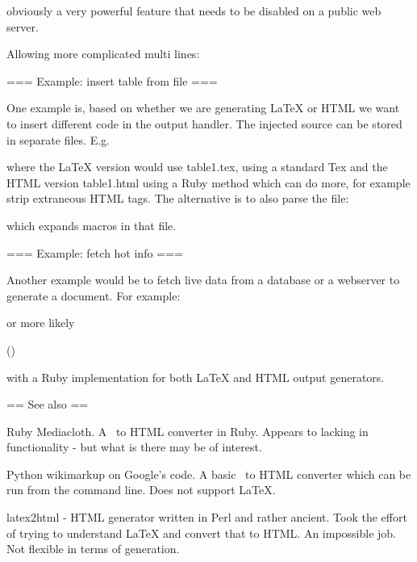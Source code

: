 
obviously a very powerful feature that needs to be disabled on a public web server.

Allowing more complicated multi lines:



=== Example: insert table from file ===
  
One example is, based on whether we are generating LaTeX or HTML we
want to insert different code in the output handler. The injected
source can be stored in separate files. E.g.


where the LaTeX version would use table1.tex, using a standard Tex
 and the HTML version table1.html using a Ruby method
which can do more, for example strip extraneous HTML tags. The
alternative is to also parse the file:


which expands macros in that file.

=== Example: fetch hot info ===

Another example would be to fetch live data from a database or a
webserver to generate a document. For example:


or more likely

  \userinfo(\username)

with a Ruby implementation for both LaTeX and HTML output generators.


== See also ==

Ruby Mediacloth. A \mediawiki\ to HTML converter in Ruby. Appears to
lacking in functionality - but what is there may be of interest.

Python wikimarkup on Google's code. A basic \mediawiki\ to HTML
converter which can be run from the command line. Does not support
LaTeX.

latex2html - HTML generator written in Perl and rather ancient. Took
the effort of trying to understand LaTeX and convert that to HTML. An
impossible job. Not flexible in terms of generation.
